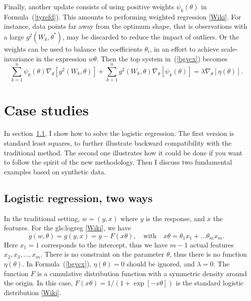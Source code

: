 \documentclass[oneside,10pt]{book}
\begin{document}
Finally, another update consists of using positive weights $\psi_k(\theta)$ in Formula~(\ref{tyrefd}). This amounts to performing
 \textcolor{index}{weighted regression} [\href{https://en.wikipedia.org/wiki/Generalized_least_squares#Weighted_least_squares}{Wiki}].
 For instance, data points far away from the optimum shape, that is observations with a large $g^2(W_k,\theta^*)$, may be discarded to reduce the
 impact of outliers. Or the weights can be used to balance the coefficients $\theta_i$, in an effort to achieve scale-invariance in the expression
 $w\theta$.  Then the top system in~(\ref{bgvcx}) becomes
\begin{equation}
 \sum_{k=1}^n \psi_k(\theta)\nabla_\theta [g^2(W_k,\theta)] +\sum_{k=1}^n g^2(W_k,\theta)\nabla_\theta[\psi_k(\theta)]  =\lambda \nabla_\theta [\eta(\theta)].  \label{bgvcx2_1228}
\end{equation}



\section{Case studies}

In section~\ref{2ways}, I show how to solve the logistic regression. The first version is standard least squares, to further illustrate
backward compatibility with the traditional method. The second one illustrates how it could be done if you want to follow the spirit of the new methodology.  Then I discuss two fundamental examples based on synthetic data.

\subsection{Logistic regression, two ways}\label{2ways}

In the traditional setting, $w=(y,x)$ where $y$ is the response, and $x$ the features. For the
\gls{gls:logreg}
 [\href{https://en.wikipedia.org/wiki/Logistic_regression}{Wiki}],
we have
$$
g(w,\theta)=g(y,x)= y-F(x\theta), \quad \text{with } \text{ } x\theta=\theta_1 x_1 + \dots \theta_m x_m.
$$
Here $x_1=1$ corresponds to the intercept, thus we have $m-1$ actual features $x_2,x_3,\dots,x_m$. There is no constraint on the parameter $\theta$,
 thus there is no function $\eta(\theta)$. In Formula~(\ref{bgvcx}), $\eta(\theta)=0$ should be ignored, and $\lambda=0$. The function $F$ is
 a cumulative distribution function with a symmetric density around the origin. In this case, $F(x\theta)=1/(1+\exp[-x\theta])$ is the
  standard \textcolor{index}{logistic distribution} [\href{https://en.wikipedia.org/wiki/Logistic_distribution}{Wiki}].
\end{document}
